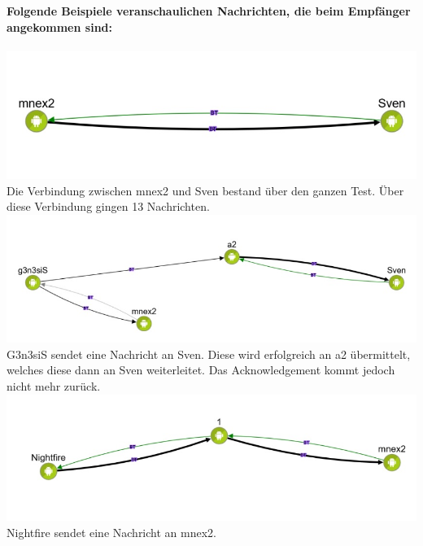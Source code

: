 \textbf{Folgende Beispiele veranschaulichen Nachrichten, die beim
Empfänger angekommen sind:}\\\\
\includegraphics[width=1.0\textwidth]{belege/grosstests/Bilder/Grosstest2/Test2Erfolg1.jpg}\\
Die Verbindung zwischen mnex2 und Sven bestand über den ganzen Test.
Über diese Verbindung gingen 13 Nachrichten.\\
\includegraphics[width=1.0\textwidth]{belege/grosstests/Bilder/Grosstest2/Test2Erfolg3.jpg}\\
G3n3siS sendet eine Nachricht an Sven. Diese wird erfolgreich an a2
übermittelt, welches diese dann an Sven weiterleitet. Das
Acknowledgement kommt jedoch nicht mehr zurück.\\
\includegraphics[width=1.0\textwidth]{belege/grosstests/Bilder/Grosstest2/Test2Erfolg4.jpg}\\
Nightfire sendet eine Nachricht an mnex2.\\


